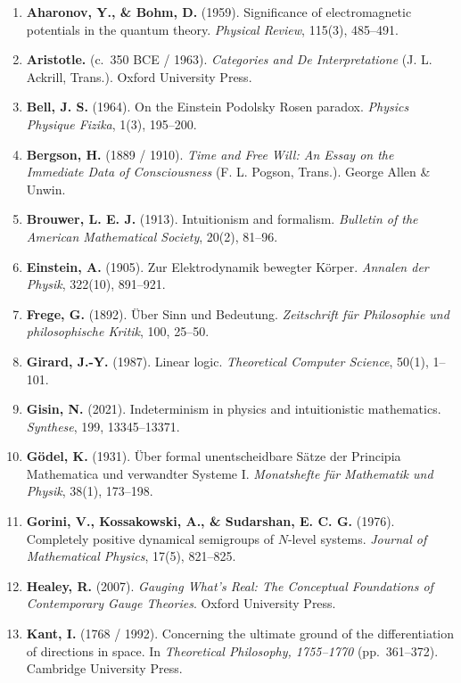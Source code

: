 \documentclass[
]{article}
\providecommand{\tightlist}{%
  \setlength{\itemsep}{0pt}\setlength{\parskip}{0pt}}
\begin{document}
\begin{enumerate}
\def\labelenumi{\arabic{enumi}.}
\tightlist
\item
  \textbf{Aharonov, Y., \& Bohm, D.} (1959). Significance of
  electromagnetic potentials in the quantum theory. \emph{Physical
  Review}, 115(3), 485--491.
\item
  \textbf{Aristotle.} (c.~350 BCE / 1963). \emph{Categories and De
  Interpretatione} (J. L. Ackrill, Trans.). Oxford University Press.
\item
  \textbf{Bell, J. S.} (1964). On the Einstein Podolsky Rosen paradox.
  \emph{Physics Physique Fizika}, 1(3), 195--200.
\item
  \textbf{Bergson, H.} (1889 / 1910). \emph{Time and Free Will: An Essay
  on the Immediate Data of Consciousness} (F. L. Pogson, Trans.). George
  Allen \& Unwin.
\item
  \textbf{Brouwer, L. E. J.} (1913). Intuitionism and formalism.
  \emph{Bulletin of the American Mathematical Society}, 20(2), 81--96.
\item
  \textbf{Einstein, A.} (1905). Zur Elektrodynamik bewegter Körper.
  \emph{Annalen der Physik}, 322(10), 891--921.
\item
  \textbf{Frege, G.} (1892). Über Sinn und Bedeutung. \emph{Zeitschrift
  für Philosophie und philosophische Kritik}, 100, 25--50.
\item
  \textbf{Girard, J.-Y.} (1987). Linear logic. \emph{Theoretical
  Computer Science}, 50(1), 1--101.
\item
  \textbf{Gisin, N.} (2021). Indeterminism in physics and intuitionistic
  mathematics. \emph{Synthese}, 199, 13345--13371.
\item
  \textbf{Gödel, K.} (1931). Über formal unentscheidbare Sätze der
  Principia Mathematica und verwandter Systeme I. \emph{Monatshefte für
  Mathematik und Physik}, 38(1), 173--198.
\item
  \textbf{Gorini, V., Kossakowski, A., \& Sudarshan, E. C. G.} (1976).
  Completely positive dynamical semigroups of \(N\)-level systems.
  \emph{Journal of Mathematical Physics}, 17(5), 821--825.
\item
  \textbf{Healey, R.} (2007). \emph{Gauging What's Real: The Conceptual
  Foundations of Contemporary Gauge Theories}. Oxford University Press.
\item
  \textbf{Kant, I.} (1768 / 1992). Concerning the ultimate ground of the
  differentiation of directions in space. In \emph{Theoretical
  Philosophy, 1755--1770} (pp.~361--372). Cambridge University Press.

\end{enumerate}
\end{document}
